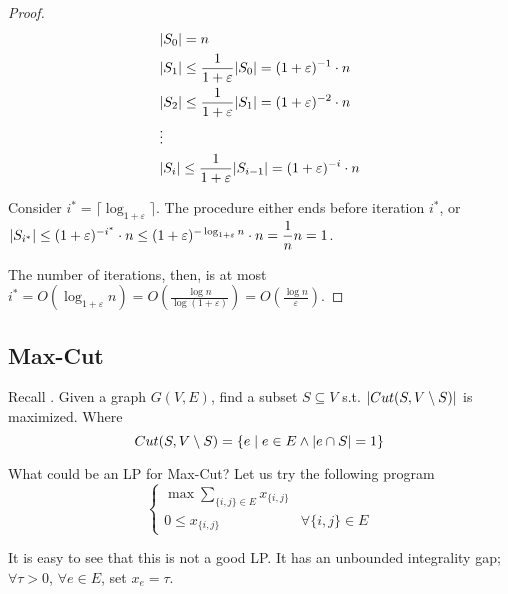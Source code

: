 \begin{proof}
        \begin{equation*}
            \begin{split}
                &\vert S_0 \vert = n\\
                &\vert S_1 \vert \leq \dfrac{1}{1 + \varepsilon} \vert S_0 \vert = (1+\varepsilon)^{-1} \cdot n\\
                &\vert S_2 \vert \leq \dfrac{1}{1 + \varepsilon} \vert S_1 \vert = (1+\varepsilon)^{-2} \cdot n\\
                &\vdots\\
                &\vert S_i \vert \leq \dfrac{1}{1 + \varepsilon} \vert S_{i-1} \vert = (1+\varepsilon)^{-i} \cdot n\\
            \end{split}
        \end{equation*}

        Consider $i^* = \lceil \log_{1+\varepsilon} \rceil$. The procedure either ends before iteration $i^*$, or $\vert S_{i^*} \vert \leq (1+\varepsilon)^{-i^*} \cdot n \leq (1+\varepsilon)^{- \log _{1+\varepsilon} n} \cdot n = \dfrac{1}{n} n = 1$.

        The number of iterations, then, is at most $i^* = O(\log_{1+\varepsilon} n) = O(\frac{\log n}{\log(1+\varepsilon)}) = O(\frac{\log n}{\varepsilon})$.
    \end{proof}


\subsection{Max-Cut}
    Recall .
    Given a graph $G(V,E)$, find a subset $S \subseteq V$ s.t. $\vert Cut(S, V \setminus S) \vert$ is maximized.
    Where
    \[ Cut(S, V \setminus S) = \{ e \; \vert \; e \in E \wedge \vert e \cap S \vert = 1 \} \]

    What could be an LP for Max-Cut? Let us try the following program
    \begin{equation}
        \begin{cases}
            \max \sum_{\{i,j\} \in E} x_{\{i,j\}}\\
            0 \leq x_{\{i,j\}} & \forall \{i,j\} \in E
        \end{cases}
    \end{equation}

    It is easy to see that this is not a good LP.\@
    It has an unbounded integrality gap; $\forall \tau > 0$, $\forall e \in E$, set $x_e = \tau$.

